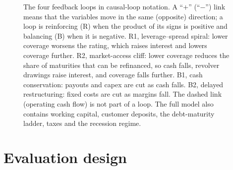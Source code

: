 \documentclass[11pt]{article}
\begin{document}
\begin{figure}[t]
\caption{The four feedback loops in causal-loop notation. A ``$+$'' (``$-$'') link means that the variables move in the same (opposite) direction; a loop is reinforcing (R) when the product of its signs is positive and balancing (B) when it is negative. R1, leverage--spread spiral: lower coverage worsens the rating, which raises interest and lowers coverage further. R2, market-access cliff: lower coverage reduces the share of maturities that can be refinanced, so cash falls, revolver drawings raise interest, and coverage falls further. B1, cash conservation: payouts and capex are cut as cash falls. B2, delayed restructuring: fixed costs are cut as margins fall. The dashed link (operating cash flow) is not part of a loop. The full model also contains working capital, customer deposits, the debt-maturity ladder, taxes and the recession regime.}
\label{fig:loops}
\end{figure}

\section{Evaluation design}\label{sec:design}
\end{document}
